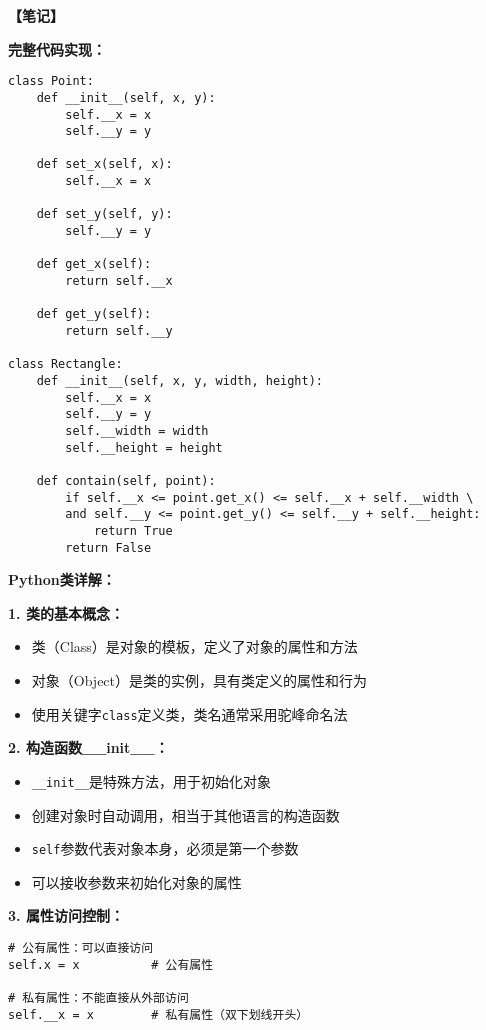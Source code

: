 \begin{mdframed}
  \textbf{\color{red}【笔记】}

  \textbf{完整代码实现：}
  \begin{lstlisting}
class Point:
    def __init__(self, x, y):
        self.__x = x
        self.__y = y

    def set_x(self, x):
        self.__x = x

    def set_y(self, y):
        self.__y = y

    def get_x(self):
        return self.__x

    def get_y(self):
        return self.__y

class Rectangle:
    def __init__(self, x, y, width, height):
        self.__x = x
        self.__y = y
        self.__width = width
        self.__height = height

    def contain(self, point):
        if self.__x <= point.get_x() <= self.__x + self.__width \
        and self.__y <= point.get_y() <= self.__y + self.__height:
            return True
        return False
  \end{lstlisting}

  \textbf{Python类详解：}

  \textbf{1. 类的基本概念：}
  \begin{itemize}
    \item 类（Class）是对象的模板，定义了对象的属性和方法
    \item 对象（Object）是类的实例，具有类定义的属性和行为
    \item 使用关键字\texttt{class}定义类，类名通常采用驼峰命名法
  \end{itemize}

  \textbf{2. 构造函数\_\_init\_\_：}
  \begin{itemize}
    \item \texttt{\_\_init\_\_}是特殊方法，用于初始化对象
    \item 创建对象时自动调用，相当于其他语言的构造函数
    \item \texttt{self}参数代表对象本身，必须是第一个参数
    \item 可以接收参数来初始化对象的属性
  \end{itemize}

  \textbf{3. 属性访问控制：}
  \begin{lstlisting}
# 公有属性：可以直接访问
self.x = x          # 公有属性

# 私有属性：不能直接从外部访问
self.__x = x        # 私有属性（双下划线开头）


\end{lstlisting}
\end{mdframed}
